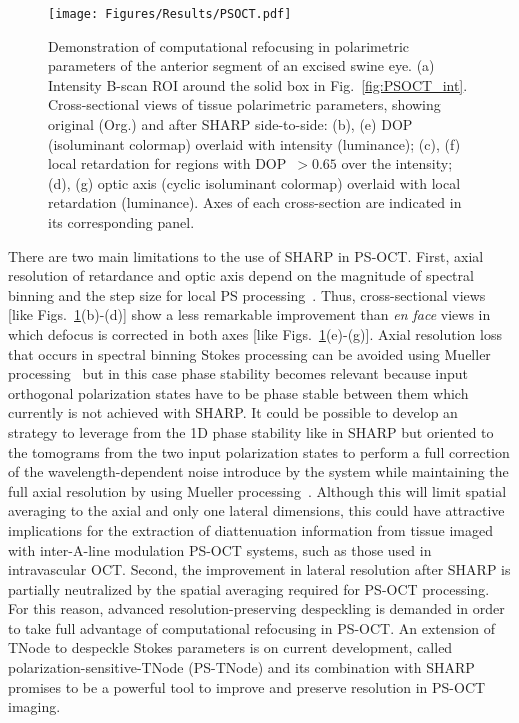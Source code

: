 \begin{figure}[htb!]
	\centering
	\texttt{[image: Figures/Results/PSOCT.pdf]}
	\caption[Demonstration of computational refocusing in polarimetric parameters of the anterior segment of an excised swine eye.]{Demonstration of computational refocusing in polarimetric parameters of the anterior segment of an excised swine eye. (a) Intensity B-scan ROI around the solid box in Fig.~\ref{fig:PSOCT_int}. Cross-sectional views of tissue polarimetric parameters, showing original (Org.) and after SHARP side-to-side: (b), (e) DOP (isoluminant colormap) overlaid with intensity (luminance); (c), (f) local retardation for regions with DOP~$>0.65$ over the intensity; (d), (g) optic axis (cyclic isoluminant colormap) overlaid with local retardation (luminance). Axes of each cross-section are indicated in its corresponding panel.}
	\label{fig:PSOCT}
\end{figure}

There are two main limitations to the use of SHARP in PS-OCT. First, axial resolution of retardance and optic axis depend on the magnitude of spectral binning and the step size for local PS processing~\cite{Villiger2013_Spectral}. Thus, cross-sectional views [like Figs.~\ref{fig:PSOCT}(b)-(d)] show a less remarkable improvement than \textit{en face} views in which defocus is corrected in both axes [like Figs.~\ref{fig:PSOCT}(e)-(g)]. Axial resolution loss that occurs in spectral binning Stokes processing can be avoided using Mueller processing~\cite{Li2018_Robust} but in this case phase stability becomes relevant because input orthogonal polarization states have to be phase stable between them which currently is not achieved with SHARP. It could be possible to develop an strategy to leverage from the 1D phase stability like in SHARP but oriented to the tomograms from the two input polarization states to perform a full correction of the wavelength-dependent noise introduce by the system while maintaining the full axial resolution by using Mueller processing~\cite{Li2018_Robust}. Although this will limit spatial averaging to the axial and only one lateral dimensions, this could have attractive implications for the extraction of diattenuation information from tissue imaged with inter-A-line modulation PS-OCT systems, such as those used in intravascular OCT. Second, the improvement in lateral resolution after SHARP is partially neutralized by the spatial averaging required for PS-OCT processing. For this reason, advanced resolution-preserving despeckling is demanded in order to take full advantage of computational refocusing in PS-OCT. An extension of TNode to despeckle Stokes parameters is on current development, called polarization-sensitive-TNode (PS-TNode) and its combination with SHARP promises to be a powerful tool to improve and preserve resolution in PS-OCT imaging.